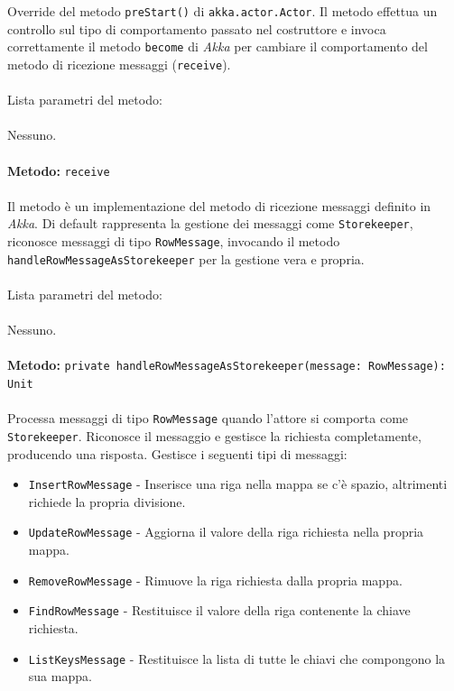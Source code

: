 \documentclass[a4paper]{article}
\begin{document}
			Override del metodo \texttt{preStart()} di \texttt{akka.actor.Actor}. Il metodo effettua un controllo sul tipo di comportamento passato nel costruttore e invoca correttamente il metodo \texttt{become} di \emph{Akka} per cambiare il comportamento del metodo di ricezione messaggi (\texttt{receive}).
			\\ \\
			Lista parametri del metodo:
			\\ \\
				Nessuno.
			\\ \\
		\textbf{Metodo: }\texttt{receive}
			\\ \\
			Il metodo è un implementazione del metodo di ricezione messaggi definito in \emph{Akka}. Di default rappresenta la gestione dei messaggi come \texttt{Storekeeper}, riconosce messaggi di tipo \texttt{RowMessage}, invocando il metodo \texttt{handleRowMessageAsStorekeeper} per la gestione vera e propria.
			\\ \\
			Lista parametri del metodo:
			\\ \\
			Nessuno.
			\\ \\
		\textbf{Metodo: }\texttt{private handleRowMessageAsStorekeeper(message: RowMessage): Unit}
			\\ \\
			Processa messaggi di tipo \texttt{RowMessage} quando l'attore si comporta come \texttt{Storekeeper}. Riconosce il messaggio e gestisce la richiesta completamente, producendo una risposta.
			Gestisce i seguenti tipi di messaggi:
			\begin{itemize}
				\item \texttt{InsertRowMessage} - Inserisce una riga nella mappa se c'è spazio, altrimenti richiede la propria divisione.
				\item \texttt{UpdateRowMessage} - Aggiorna il valore della riga richiesta nella propria mappa.
				\item \texttt{RemoveRowMessage} - Rimuove la riga richiesta dalla propria mappa.
				\item \texttt{FindRowMessage} - Restituisce il valore della riga contenente la chiave richiesta.
				\item \texttt{ListKeysMessage} - Restituisce la lista di tutte le chiavi che compongono la sua mappa.
			\end{itemize}
\end{document}
